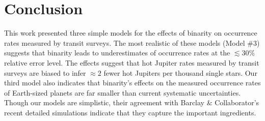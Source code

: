 \section{Conclusion}
\label{sec:conclusion}

This work presented three simple models for the effects of binarity on 
occurrence rates measured by transit surveys.
The most realistic of these models (Model \#3) suggests that binarity leads to 
underestimates of occurrence rates at the $\lesssim 30\%$ relative 
error level.
The effects suggest that hot Jupiter rates measured by transit surveys are 
biased to infer $\approx 2$ fewer hot Jupiters per thousand single stars.
Our third model also indicates that binarity's effects on the measured 
occurrence rates of Earth-sized planets are far smaller than current 
systematic uncertainties.
Though our models are simplistic, their agreement with Barclay \& 
Collaborator's recent detailed simulations indicate that they capture the 
important ingredients.